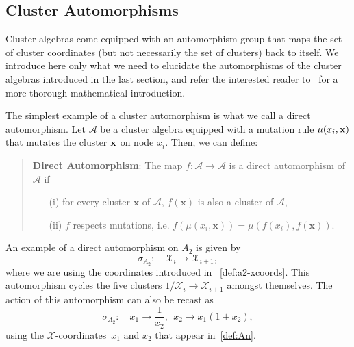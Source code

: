 \documentclass[11pt]{article}
\def\x{\mathcal{X}}
\def\xcoords{$\mathcal{X}$-coordinates}
\def\a{\mathcal{A}}
\begin{document}

\subsection{Cluster Automorphisms}\label{sec:automorphisms}

Cluster algebras come equipped with an automorphism group that maps the set of cluster coordinates (but not necessarily the set of clusters) back to itself. We introduce here only what we need to elucidate the automorphisms of the cluster algebras introduced in the last section, and refer the interested reader to~\cite{Chang:2015} for a more thorough mathematical introduction. 

The simplest example of a cluster automorphism is what we call a direct automorphism. Let $\a$ be a cluster algebra equipped with a mutation rule $\mu(x_i, \bf{x})$ that mutates the cluster $\bf{x}$ on node $x_i$. Then, we can define:
\begin{quote}
{\bf Direct Automorphism}: The map $f: \a \to \a$ is a direct automorphism of $\a$ if 
\vspace{-.2cm}
 \begin{itemize}
 \item[(i)] for every cluster $\mathbf{x}$ of $\a$, $f(\mathbf{x})$ is also a cluster of $\a$, 
 \item[(ii)] $f$ respects mutations, i.e. $f(\mu(x_i,\mathbf{x})) = \mu(f(x_i),f(\mathbf{x}))$.
 \end{itemize}
\end{quote}
An example of a direct automorphism on $A_2$ is given by
\begin{equation}
  \sigma_{A_2}:\quad \mathcal{X}_i \to \mathcal{X}_{i+1},
\end{equation}
where we are using the coordinates introduced in ~\eqref{def:a2-xcoords}. This automorphism cycles the five clusters $1/\x_i\to \x_{i+1}$ amongst themselves. The action of this automorphism can also be recast as
\begin{equation}
  \sigma_{A_2}:\quad x_1\to \frac{1}{x_2},~~ x_2\to x_1(1+x_2),
\end{equation}
using the \xcoords\ $x_1$ and $x_2$ that appear in~\eqref{def:An}. 
\end{document}
